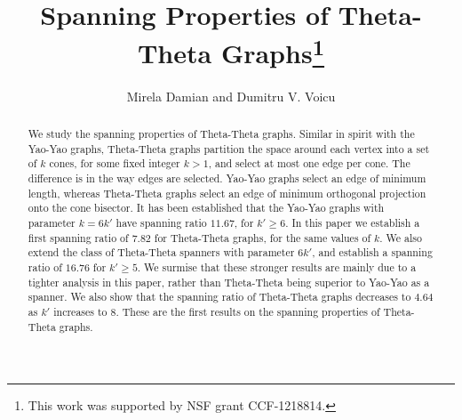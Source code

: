 \documentclass[runningheads,a4paper]{llncs}
\begin{document}
\mainmatter  

\title{Spanning Properties of Theta-Theta Graphs\thanks{This work was supported by NSF grant CCF-1218814.}}

\author{Mirela Damian and Dumitru V. Voicu}


\date{}

\maketitle

\begin{abstract}
We study the spanning properties of Theta-Theta graphs. Similar in spirit with the Yao-Yao graphs, Theta-Theta graphs partition the space around each vertex into a set of $k$ cones, for some fixed integer $k > 1$, and select at most one edge per cone. The difference is in the way edges are selected. Yao-Yao graphs select an edge of minimum length, whereas Theta-Theta graphs select an edge of minimum orthogonal projection onto the cone bisector. It has been established that the Yao-Yao graphs with parameter $k = 6k'$ have spanning ratio $11.67$, for $k' \ge 6$. In this paper we establish a first spanning ratio of $7.82$ for Theta-Theta graphs, for the same values of $k$. We also extend the class of Theta-Theta spanners with parameter $6k'$, and establish a spanning ratio of $16.76$ for $k' \ge 5$. We surmise that these stronger results are mainly due to a tighter analysis in this paper, rather than Theta-Theta being superior to Yao-Yao as a spanner. We also show that the spanning ratio of Theta-Theta graphs decreases to $4.64$ as $k'$ increases to $8$.  These are the first results on the spanning properties of Theta-Theta graphs. 
\end{abstract}
\end{document}
